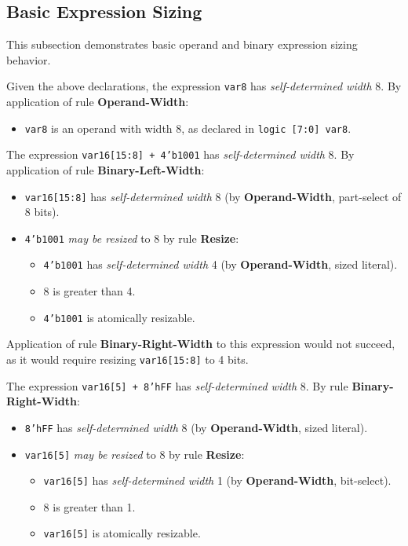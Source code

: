 \documentclass{article}
\newcommand{\sv}[1]{\texttt{#1}}
\newcommand{\sds}{\emph{self-determined width}}
\newcommand{\mbr}{\emph{may be resized}}
\begin{document}
\subsection{Basic Expression Sizing}

This subsection demonstrates basic operand and binary expression
sizing behavior.

Given the above declarations, the expression \sv{var8} has \sds{} 8.
By application of rule \textbf{Operand-Width}:
\begin{itemize}
  \item \sv{var8} is an operand with width 8, as declared
    in \sv{logic [7:0] var8}.
\end{itemize}

The expression \sv{var16[15:8] + 4'b1001} has \sds{} 8.
By application of rule \textbf{Binary-Left-Width}:
\begin{itemize}
  \item \sv{var16[15:8]} has \sds{} 8 (by
    \textbf{Operand-Width}, part-select of 8 bits).
  \item \sv{4'b1001} \mbr{} to 8 by rule \textbf{Resize}:
    \begin{itemize}
      \item \sv{4'b1001} has \sds{} 4 (by
        \textbf{Operand-Width}, sized literal).
      \item 8 is greater than 4.
      \item \sv{4'b1001} is atomically resizable.
    \end{itemize}
\end{itemize}

Application of rule \textbf{Binary-Right-Width} to this expression
would not succeed, as it would require resizing \sv{var16[15:8]} to
4 bits.

The expression \sv{var16[5] + 8'hFF} has \sds{} 8. By rule
\textbf{Binary-Right-Width}:
\begin{itemize}
  \item \sv{8'hFF} has \sds{} 8 (by \textbf{Operand-Width},
    sized literal).
  \item \sv{var16[5]} \mbr{} to 8 by rule \textbf{Resize}:
    \begin{itemize}
      \item \sv{var16[5]} has \sds{} 1 (by
        \textbf{Operand-Width}, bit-select).
      \item 8 is greater than 1.
      \item \sv{var16[5]} is atomically resizable.
    \end{itemize}
\end{itemize}
\end{document}
